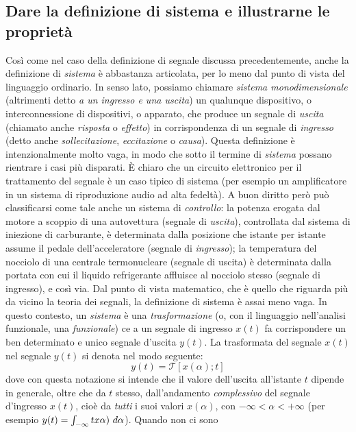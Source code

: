\documentclass[12pt,oneside,openany]{memoir}
\numberwithin{equation}{subsection}
\begin{document}
\subsection{Dare la definizione di sistema e illustrarne le propriet\`a}
Cos\`i come nel caso della definizione di segnale discussa precedentemente,
anche la definizione di \textit{sistema} \`e abbastanza articolata, per lo meno
dal punto di vista del linguaggio ordinario. In senso lato, possiamo chiamare
\textit{sistema monodimensionale} (altrimenti detto \textit{a un ingresso e una
uscita}) un qualunque dispositivo, o interconnessione di dispositivi, o
apparato, che produce un segnale di \textit{uscita} (chiamato anche
\textit{risposta} o \textit{effetto}) in corrispondenza di un segnale di
\textit{ingresso} (detto anche \textit{sollecitazione}, \textit{eccitazione}
o \textit{causa}). Questa definizione \`e intenzionalmente molto vaga, in modo
che sotto il termine di \textit{sistema} possano rientrare i casi pi\`u
disparati. \`E chiaro che un circuito elettronico per il trattamento del segnale
\`e un caso tipico di sistema (per esempio un amplificatore in un sistema di
riproduzione audio ad alta fedelt\`a). A buon diritto per\`o pu\`o classificarsi
come tale anche un sistema di \textit{controllo}: la potenza erogata dal motore
a scoppio di una autovettura (segnale di \textit{uscita}), controllata dal
sistema di iniezione di carburante, \`e determinata dalla posizione che istante
per istante assume il pedale dell'acceleratore (segnale di \textit{ingresso});
la temperatura del nocciolo di una centrale termonucleare (segnale di uscita)
\`e determinata dalla portata con cui il liquido refrigerante affluisce al
nocciolo stesso (segnale di ingresso), e cos\`i via.
\bigbreak
Dal punto di vista matematico, che \`e quello che riguarda pi\`u da vicino la
teoria dei segnali, la definizione di sistema \`e assai meno vaga. In questo
contesto, un \textit{sistema} \`e una \textit{trasformazione} (o, con il
linguaggio nell'analisi funzionale, una \textit{funzionale}) ce a un segnale
di ingresso $x(t)$ fa corrispondere un ben determinato e unico segnale d'uscita
$y(t)$. La trasformata del segnale $x(t)$ nel segnale $y(t)$ si denota nel modo
seguente:
\[
    y(t) = \mathcal{T}[x(\alpha); t]
\]
dove con questa notazione si intende che il valore dell'uscita all'istante $t$
dipende in generale, oltre che da $t$ stesso, dall'andamento
\textit{complessivo} del segnale d'ingresso $x(t)$, cio\`e da \textit{tutti}
i suoi valori $x(\alpha)$, con $-\infty < \alpha < +\infty$ (per esempio
$y(t) = \int\displaylimits_{-\infty}{t} x\alpha) \ d\alpha$). Quando non ci sono
\end{document}
